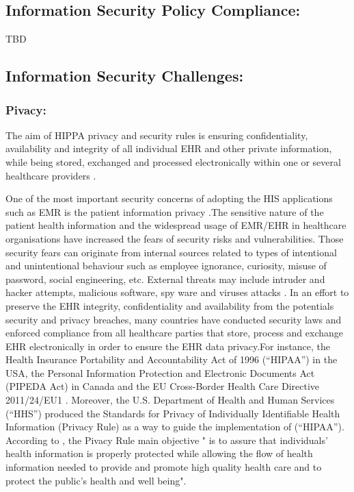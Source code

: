 \subsection{Information Security Policy Compliance:}
TBD
\subsection{Information Security Challenges:}
\subsubsection{\textbf{Pivacy:}}

The aim of HIPPA privacy and security rules is ensuring confidentiality, availability and integrity of all individual EHR and other private information,  while being stored, exchanged and processed electronically within one or several healthcare providers \cite{andriole2014security}. 

One of the most important security concerns of adopting the HIS applications such as EMR is the patient information privacy \cite{Mahfuth2016}.The sensitive nature of the patient health information and the widespread usage of EMR/EHR in healthcare organisations have increased the fears of security risks and vulnerabilities. Those security fears can originate from internal sources related to types of intentional and unintentional behaviour such as employee ignorance, curiosity, misuse of password, social engineering, etc. External threats may include intruder and hacker attempts, malicious software, spy ware and viruses attacks  \cite{narayana2010security}. In an effort to preserve the EHR integrity, confidentiality and availability from the potentials security and privacy breaches, many countries have conducted security laws and enforced compliance from all healthcare parties that store, process and exchange EHR electronically in order to ensure the EHR data privacy\cite{Hsu,narayana2010security,Rahim2016}.For instance, the Health Insurance Portability and Accountability Act of 1996 (“HIPAA”) in the USA, the Personal Information Protection and Electronic Documents Act (PIPEDA  Act) in Canada and the EU Cross-Border Health Care Directive 2011/24/EU1 \cite{DepartmentofHealthandHumanServices,Bensefia2014}. Moreover, the U.S. Department of Health and Human Services (“HHS”) produced the Standards for Privacy of Individually Identifiable Health Information (Privacy Rule) as a way to guide the implementation of (“HIPAA”). According to \cite{DepartmentofHealthandHumanServices}, the Pivacy Rule main objective " is to assure that individuals’ health information is properly protected while allowing the flow of health information needed to provide and promote high quality health care and to protect the public's health and well being".  


